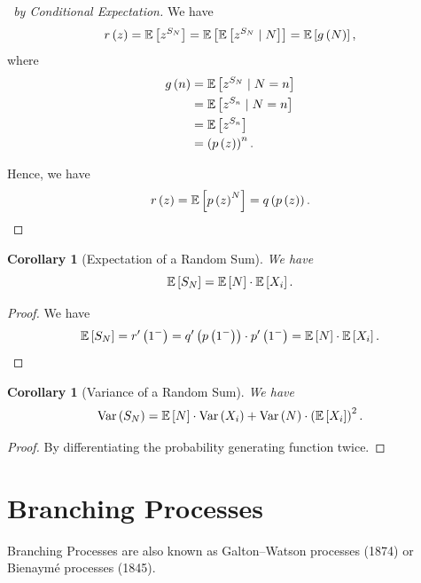 \documentclass{article}
\newtheorem{corollary}[theorem]{Corollary}
\theoremstyle{definition}
\theoremstyle{remark}
\newcommand{\Expt}{\mathbb{E}}
\newcommand{\Conditional}[2]{#1\mid #2}
\newcommand{\Var}{\operatorname{Var}}
\begin{document}
\begin{proof}[\proofname\ by Conditional Expectation]
    We have
    \[
        r\pqty{z} = \Expt\bqty{z^{S_N}} = \Expt\bqty{\Expt\bqty{\Conditional{z^{S_N}}{N}}} = \Expt\bqty{g\pqty{N}},
    \]
    where
    \begin{align*}
        g\pqty{n} &= \Expt\bqty{\Conditional{z^{S_N}}{N=n}} \\
        &= \Expt\bqty{\Conditional{z^{S_n}}{N = n}} \\
        &= \Expt\bqty{z^{S_n}} \\
        &= \pqty{p\pqty{z}}^{n}.
    \end{align*}

    Hence, we have
    \[
        r\pqty{z} = \Expt\bqty{p\pqty{z}^{N}} = q\pqty{p\pqty{z}}.
    \]
\end{proof}

\begin{corollary}[Expectation of a Random Sum]
    \label{cor:expt-random-sum}%
    We have
    \[
        \Expt\bqty{S_N} = \Expt\bqty{N} \cdot \Expt\bqty{X_i}.
    \]
\end{corollary}

\begin{proof}
    We have
    \[
        \Expt\bqty{S_N} = r' \pqty{1^-} = q' \pqty{p\pqty{1^-}} \cdot p'\pqty{1^-} = \Expt\bqty{N} \cdot \Expt\bqty{X_i}.
    \]
\end{proof}

\begin{corollary}[Variance of a Random Sum]
    \label{cor:var-random-sum}%
    We have
    \[
        \Var\pqty{S_N} = \Expt\bqty{N} \cdot \Var\pqty{X_i} + \Var\pqty{N} \cdot \pqty{\Expt\bqty{X_i}}^2.
    \]
\end{corollary}

\begin{proof}
    By differentiating the probability generating function twice.
\end{proof}

\section{Branching Processes}

Branching Processes are also known as Galton--Watson processes (1874) or Bienaym\'{e} processes (1845).
\end{document}

